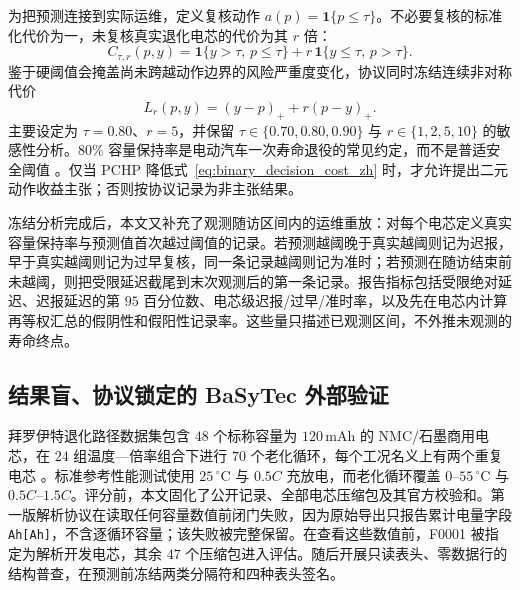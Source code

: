 \documentclass[UTF8,11pt]{ctexart}
\begin{document}
为把预测连接到实际运维，定义复核动作 $a(p)=\mathbf 1\{p\leq\tau\}$。不必要复核的标准化代价为一，未复核真实退化电芯的代价为其 $r$ 倍：
\begin{equation}
C_{\tau,r}(p,y)=\mathbf 1\{y>\tau,\,p\leq\tau\}
+r\,\mathbf 1\{y\leq\tau,\,p>\tau\}.
\label{eq:binary_decision_cost_zh}
\end{equation}
鉴于硬阈值会掩盖尚未跨越动作边界的风险严重度变化，协议同时冻结连续非对称代价
\begin{equation}
L_r(p,y)=(y-p)_{+}+r(p-y)_{+}.
\label{eq:continuous_decision_cost_zh}
\end{equation}
主要设定为 $\tau=0.80$、$r=5$，并保留 $\tau\in\{0.70,0.80,0.90\}$ 与 $r\in\{1,2,5,10\}$ 的敏感性分析。$80\%$ 容量保持率是电动汽车一次寿命退役的常见约定，而不是普适安全阈值 \citep{saxena2015eol,montes2022secondlife}。仅当 PCHP 降低式~\eqref{eq:binary_decision_cost_zh} 时，才允许提出二元动作收益主张；否则按协议记录为非主张结果。

冻结分析完成后，本文又补充了观测随访区间内的运维重放：对每个电芯定义真实容量保持率与预测值首次越过阈值的记录。若预测越阈晚于真实越阈则记为迟报，早于真实越阈则记为过早复核，同一条记录越阈则记为准时；若预测在随访结束前未越阈，则把受限延迟截尾到末次观测后的第一条记录。报告指标包括受限绝对延迟、迟报延迟的第 $95$ 百分位数、电芯级迟报/过早/准时率，以及先在电芯内计算再等权汇总的假阴性和假阳性记录率。这些量只描述已观测区间，不外推未观测的寿命终点。

\subsection{结果盲、协议锁定的 BaSyTec 外部验证}

拜罗伊特退化路径数据集包含 $48$ 个标称容量为 $120\,\mathrm{mAh}$ 的 NMC/石墨商用电芯，在 $24$ 组温度—倍率组合下进行 $70$ 个老化循环，每个工况名义上有两个重复电芯 \citep{ramasubramanian2025degradation,roder2025degradationdata}。标准参考性能测试使用 $25\,^{\circ}\mathrm{C}$ 与 $0.5C$ 充放电，而老化循环覆盖 $0$--$55\,^{\circ}\mathrm{C}$ 与 $0.5C$--$1.5C$。评分前，本文固化了公开记录、全部电芯压缩包及其官方校验和。第一版解析协议在读取任何容量数值前闭门失败，因为原始导出只报告累计电量字段 \texttt{Ah[Ah]}，不含逐循环容量；该失败被完整保留。在查看这些数值前，F0001 被指定为解析开发电芯，其余 $47$ 个压缩包进入评估。随后开展只读表头、零数据行的结构普查，在预测前冻结两类分隔符和四种表头签名。
\end{document}
